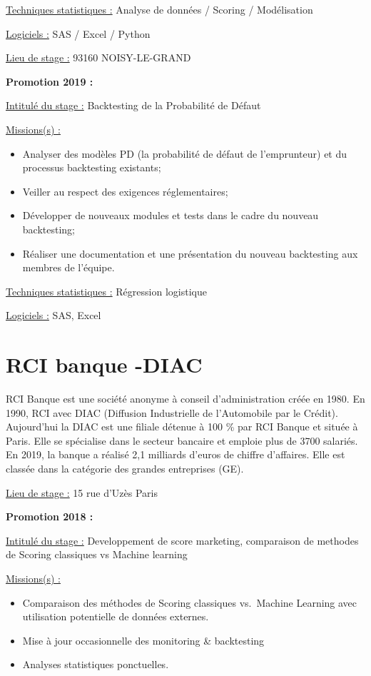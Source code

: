 \documentclass[
  letterpaper,
  DIV=11,
  numbers=noendperiod]{scrreprt}
\begin{document}
\uline{Techniques statistiques :} Analyse de données / Scoring /
Modélisation

\uline{Logiciels :} SAS / Excel / Python

\uline{Lieu de stage :} 93160 NOISY-LE-GRAND

\textbf{Promotion 2019 :}

\uline{Intitulé du stage :} Backtesting de la Probabilité de Défaut

\uline{Missions(s) :}

\begin{itemize}
\item
  Analyser des modèles PD (la probabilité de défaut de l'emprunteur) et
  du processus backtesting existants;
\item
  Veiller au respect des exigences réglementaires;
\item
  Développer de nouveaux modules et tests dans le cadre du nouveau
  backtesting;
\item
  Réaliser une documentation et une présentation du nouveau backtesting
  aux membres de l'équipe.
\end{itemize}

\uline{Techniques statistiques :} Régression logistique

\uline{Logiciels :} SAS, Excel

\hypertarget{rci-banque--diac}{%
\section{\texorpdfstring{\textbf{RCI banque
-DIAC}}{RCI banque -DIAC}}\label{rci-banque--diac}}

RCI Banque est une société anonyme à conseil d'administration créée en
1980. En 1990, RCI avec DIAC (Diffusion Industrielle de l'Automobile par
le Crédit). Aujourd'hui la DIAC est une filiale détenue à 100 \% par RCI
Banque et située à Paris. Elle se spécialise dans le secteur bancaire et
emploie plus de 3700 salariés. En 2019, la banque a réalisé 2,1
milliards d'euros de chiffre d'affaires. Elle est classée dans la
catégorie des grandes entreprises (GE).

\uline{Lieu de stage :} 15 rue d'Uzès Paris

\textbf{Promotion 2018 :}

\uline{Intitulé du stage :} Developpement de score marketing,
comparaison de methodes de Scoring classiques vs Machine learning

\uline{Missions(s) :}

\begin{itemize}
\item
  Comparaison des méthodes de Scoring classiques vs.~Machine Learning
  avec utilisation potentielle de données externes.
\item
  Mise à jour occasionnelle des monitoring \& backtesting
\item
  Analyses statistiques ponctuelles.
\end{itemize}
\end{document}
